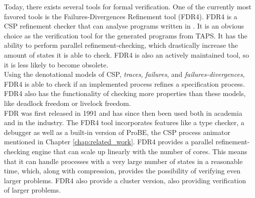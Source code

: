 Today, there exists several tools for formal verification. One of the currently most favored tools is the Failures-Divergences Refinement tool (FDR4). FDR4 is a CSP refinement checker that can analyse programs written in \cspm{}.
It is an obvious choice as the verification tool for the generated \cspm{} programs from TAPS. It has the ability to perform parallel refinement-checking, which drastically increase the amount of states it is able to check. FDR4 is also an actively maintained tool, so it is less likely to become obsolete.\\

 Using the denotational models of CSP, \textit{traces}, \textit{failures}, and \textit{failures-divergences}, FDR4 is able to check if an implemented process refines a specification process. FDR4 also has the functionality of checking more properties than these models, like deadlock freedom or livelock freedom.\\

FDR was first released in 1991 and has since then been used both in academia and in the industry. The FDR4 tool incorporates features like a \cspm{} type checker, a debugger as well as a built-in version of ProBE, the CSP process animator mentioned in Chapter \ref{chap:related_work}. FDR4 provides a parallel refinement-checking engine that can scale up linearly with the number of cores. This means that it can handle processes with a very large number of states in a reasonable time, which, along with compression, provides the possibility of verifying even larger problems. FDR4 also provide a cluster version, also providing verification of larger problems.\\


